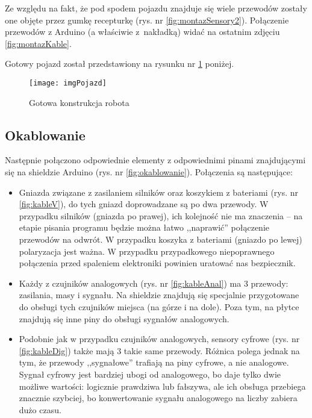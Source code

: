 \documentclass[11pt]{article}
\begin{document}
Ze względu na fakt, że pod spodem pojazdu znajduje się wiele przewodów zostały one objęte przez gumkę recepturkę (rys. nr \ref{fig:montazSensory2}). Połączenie przewodów z Arduino (a właściwie z~nakładką) widać na ostatnim zdjęciu \ref{fig:montazKable}.

Gotowy pojazd został przedstawiony na rysunku nr \ref{fig:pojazd} poniżej.

\begin{figure}[h!]
	\centering
	\texttt{[image: imgPojazd]}
	\caption{Gotowa konstrukcja robota \label{fig:pojazd}}
\end{figure}

\subsection{Okablowanie}

Następnie połączono odpowiednie elementy z odpowiednimi pinami znajdującymi się na shieldzie Arduino (rys. nr \ref{fig:okablowanie}). Połączenia są następujące:
\begin{itemize}
\item Gniazda związane z zasilaniem silników oraz koszykiem z bateriami (rys. nr \ref{fig:kableV}), do tych gniazd doprowadzane są po dwa przewody. W przypadku silników (gniazda po prawej), ich kolejność nie ma znaczenia -- na etapie pisania programu będzie można łatwo ,,naprawić'' połączenie przewodów na odwrót. W przypadku koszyka z bateriami (gniazdo po lewej) polaryzacja jest ważna. W przypadku przypadkowego niepoprawnego połączenia przed spaleniem elektroniki powinien uratować nas bezpiecznik.
\item Każdy z czujników analogowych (rys. nr \ref{fig:kableAnal}) ma 3 przewody: zasilania, masy i sygnału. Na shieldzie znajdują się specjalnie przygotowane do obsługi tych czujników miejsca (na górze i na dole). Poza tym, na płytce znajdują się inne piny do obsługi sygnałów analogowych.
\item Podobnie jak w przypadku czujników analogowych, sensory cyfrowe (rys. nr \ref{fig:kableDig}) także mają 3 takie same przewody. Różnica polega jednak na tym, że przewody ,,sygnałowe'' trafiają na piny cyfrowe, a nie analogowe. Sygnał cyfrowy jest bardziej ubogi od analogowego, bo daje tylko dwie możliwe wartości: logicznie prawdziwa lub fałszywa, ale ich obsługa przebiega znacznie szybciej, bo konwertowanie sygnału analogowego na liczby zabiera dużo czasu.
\end{itemize}
\end{document}
